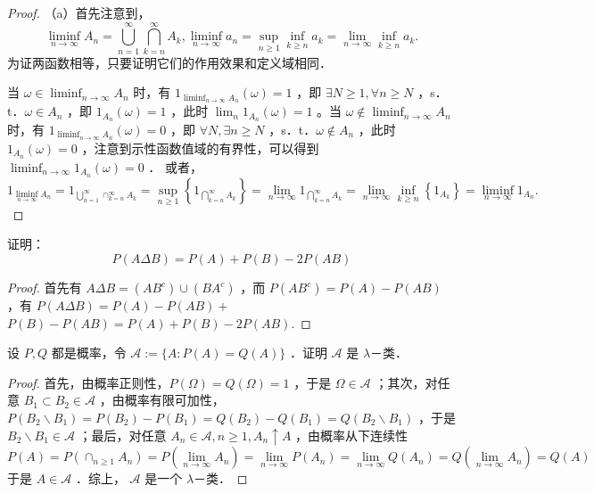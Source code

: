 \begin{proof}
    （a）首先注意到，
    $$
        \liminf _{n \rightarrow \infty} A_n=\bigcup_{n=1}^{\infty} \bigcap_{k=n}^{\infty} A_k, \liminf _{n \rightarrow \infty} a_n=\sup _{n \geq 1} \inf _{k \geq n} a_k=\lim _{n \rightarrow \infty} \inf _{k \geq n} a_k .
    $$
    为证两函数相等，只要证明它们的作用效果和定义域相同．

    当 $\omega \in \liminf _{n \rightarrow \infty} A_n$ 时，有 $1_{\liminf _{n \rightarrow \infty} A_n}(\omega)=1$ ，即 $\exists N \geq 1, \forall n \geq N$ ，s．t．$\omega \in A_n$ ，即 $1_{A_n}(\omega)=1$ ，此时 $\lim _n 1_{A_n}(\omega)=1$ 。当 $\omega \notin \liminf _{n \rightarrow \infty} A_n$ 时，有 $1_{\liminf _{n \rightarrow \infty} A_n}(\omega)=0$ ，即 $\forall N, \exists n \geq N$ ，s．t．$\omega \notin A_n$ ，此时 $1_{A_n}(\omega)=0$ ，注意到示性函数值域的有界性，可以得到 $\liminf _{n \rightarrow \infty} 1_{A_n}(\omega)=0$ ．
    或者，
    $$
        1_{\liminf _{n \rightarrow \infty} A_n}=1_{\bigcup_{n=1}^{\infty} \cap_{k=n}^{\infty} A_k}=\sup _{n \geq 1}\left\{1_{\bigcap_{k=n}^{\infty} A_k}\right\}=\lim _{n \rightarrow \infty} 1_{\bigcap_{k=n}^{\infty} A_k}=\lim _{n \rightarrow \infty} \inf _{k \geq n}\left\{1_{A_k}\right\}=\liminf _{n \rightarrow \infty} 1_{A_n} .
    $$
\end{proof}
\begin{exercise}
    证明：
    $$
        P(A \Delta B)=P(A)+P(B)-2 P(A B)
    $$
\end{exercise}
\begin{proof}
    首先有 $A \Delta B=\left(A B^c\right) \cup\left(B A^c\right)$ ，而 $P\left(A B^c\right)=P(A)-P(A B)$ ，有 $P(A \Delta B)=P(A)-P(A B)+$ $P(B)-P(A B)=P(A)+P(B)-2 P(A B)$.
\end{proof}
\begin{exercise}
    设 $P, Q$ 都是概率，令 $\mathscr{A}:=\{A: P(A)=Q(A)\}$ ．证明 $\mathscr{A}$ 是 $\lambda$－类．
\end{exercise}
\begin{proof}
    首先，由概率正则性，$P(\Omega)=Q(\Omega)=1$ ，于是 $\Omega \in \mathscr{A}$ ；其次，对任意 $B_1 \subset B_2 \in \mathscr{A}$ ，由概率有限可加性，$P\left(B_2 \backslash B_1\right)=P\left(B_2\right)-P\left(B_1\right)=Q\left(B_2\right)-Q\left(B_1\right)=Q\left(B_2 \backslash B_1\right)$ ，于是 $B_2 \backslash B_1 \in \mathscr{A}$ ；最后，对任意 $A_n \in \mathscr{A}, n \geq 1, A_n \uparrow A$ ，由概率从下连续性
    $$
        P(A)=P\left(\cap_{n \geq 1} A_n\right)=P\left(\lim _{n \rightarrow \infty} A_n\right)=\lim _{n \rightarrow \infty} P\left(A_n\right)=\lim _{n \rightarrow \infty} Q\left(A_n\right)=Q\left(\lim _{n \rightarrow \infty} A_n\right)=Q(A)
    $$
    于是 $A \in \mathscr{A}$ ．综上， $\mathscr{A}$ 是一个 $\lambda$－类．
\end{proof}

